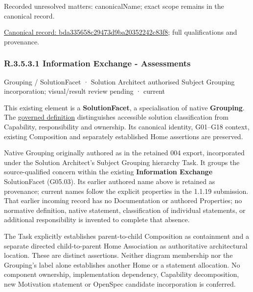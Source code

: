 {\small Recorded unresolved matters: canonicalName; exact scope remains in the canonical record.}\par
{\footnotesize \href{../../../../../../../continuum/grouping/bda335658c29473d9ba20352242c83f8.md}{Canonical record: bda335658c29473d9ba20352242c83f8}; full qualifications and provenance.}\par
\subsubsection*{R.3.5.3.1 Information Exchange - Assessments}
\label{navigation:R.3.5.3.1}

\label{element:0085c4fe23cf4b76829fae3369c9fbb1}
{\small Grouping / SolutionFacet · Solution Architect authorised Subject Grouping incorporation; visual/result review pending · current}\par

This existing element is a \textbf{SolutionFacet}, a specialisation of native
\textbf{Grouping}. The \href{\detokenize{../../../../../../../governance/continuum-representation.md#solutionfacet-classification--1119-candidate}}{governed definition}
distinguishes accessible solution classification from Capability, responsibility
and ownership. Its canonical identity, G01–G18 context, existing Composition
and separately established Home assertions are preserved.



Native Grouping originally authored as \texttt{} in the retained 004 export,
incorporated under the Solution Architect's Subject Grouping hierarchy Task.
It groups the source-qualified \texttt{} concern within
the existing \textbf{Information Exchange} SolutionFacet (G05.03). Its earlier authored name above is retained as provenance; current names
follow the explicit properties in the 1.1.19 submission.
That earlier incoming record has no Documentation or authored Properties; no normative
definition, native statement, classification of individual statements, or
additional responsibility is invented to complete that absence.



The Task explicitly establishes parent-to-child Composition as containment and
a separate directed child-to-parent Home Association as authoritative architectural
location. These are distinct assertions. Neither diagram membership nor the
Grouping's label alone establishes another Home or a statement allocation.
No component ownership, implementation dependency, Capability decomposition,
new Motivation statement or OpenSpec candidate incorporation is conferred.




